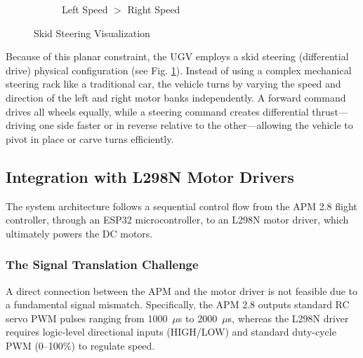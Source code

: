 \documentclass[conference]{IEEEtran}
\begin{document}
\begin{figure}[H]
\begin{subfigure}{0.4\columnwidth}
{
        }
        \caption*{Left Speed $>$ Right Speed}
    \end{subfigure}
    \caption{Skid Steering Visualization}
    \label{fig:skid}
\end{figure}

    
Because of this planar constraint, the UGV employs a skid steering (differential drive) physical configuration (see Fig. \ref{fig:skid}). Instead of using a complex mechanical steering rack like a traditional car, the vehicle turns by varying the speed and direction of the left and right motor banks independently. A forward command drives all wheels equally, while a steering command creates differential thrust—driving one side faster or in reverse relative to the other—allowing the vehicle to pivot in place or carve turns efficiently.
\subsection{Integration with L298N Motor Drivers}

The system architecture follows a sequential control flow from the APM 2.8 flight controller, through an ESP32 microcontroller, to an L298N motor driver\cite{l298n}, which ultimately powers the DC motors. 

\subsubsection{The Signal Translation Challenge}
A direct connection between the APM and the motor driver is not feasible due to a fundamental signal mismatch. Specifically, the APM 2.8 outputs standard RC servo PWM pulses ranging from 1000~$\mu$s to 2000~$\mu$s, whereas the L298N driver requires logic-level directional inputs (HIGH/LOW) and standard duty-cycle PWM (0--100\%) to regulate speed. 
\end{document}
